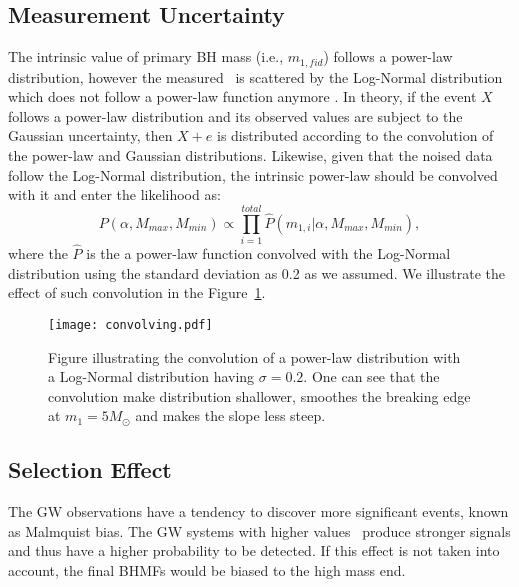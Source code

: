 \documentclass[twocolumn]{aastex62}
\begin{document}
\subsection{Measurement Uncertainty}\label{sec_likelihood_noise}
The intrinsic value of primary BH mass (i.e., $m_{1,fid}$) follows a power-law distribution, however the measured  \mone\ is scattered by the Log-Normal distribution which does not follow a power-law function anymore \citep{Koen2009}. In theory, if the event $X$ follows a power-law distribution and its observed values are subject to the Gaussian uncertainty, then $X + e$ is distributed according to the convolution of the power-law and Gaussian distributions. Likewise, given that the noised data follow the Log-Normal distribution, the intrinsic power-law should be convolved with it and enter the likelihood as:
 \begin{equation} \label{equ_lik_conv}
 P(\alpha, M_{max}, M_{min}) \propto  \prod_{i=1}^{total} \hat{P}(m_{1,i}|\alpha, M_{max}, M_{min}),
 \end{equation}
where the $\hat{P}$ is the a power-law function convolved with the Log-Normal distribution using the standard deviation as 0.2 as we assumed. We illustrate the effect of such convolution in the Figure~\ref{fig:result_slope}.

\begin{figure}%
\texttt{[image: convolving.pdf]}
\caption{
Figure illustrating the convolution of a power-law distribution with a Log-Normal distribution having $\sigma = 0.2$. One can see that the convolution make distribution shallower, smoothes the breaking edge at $m_1 = 5 M_{\odot}$ and makes the slope less steep.
}
\label{fig:result_slope}
\end{figure}

\subsection{Selection Effect}\label{sec_likelihood_sf}
The GW observations have a tendency to discover more significant events, known as Malmquist bias. The GW systems with higher values \mone\ produce  stronger signals and thus have a higher probability to be detected. If this effect is not taken into account, the final BHMFs would be biased to the high mass end.
\end{document}
